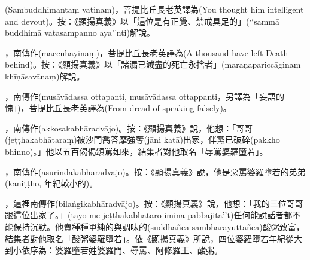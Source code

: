 \startitemgroup[noteitems]
\item{}(Sambuddhimantaṃ vatinaṃ)，菩提比丘長老英譯為(You thought him intelligent and devout)。按：《顯揚真義》以「這位是有正覺、禁戒具足的」(‘‘sammā buddhimā vatasampanno aya’’nti)解說。
\stopitemgroup

\startitemgroup[noteitems]
\item{}，南傳作(maccuhāyinaṃ)，菩提比丘長老英譯為(A thousand have left Death behind)。按：《顯揚真義》以「諸漏已滅盡的死亡永捨者」(maraṇapariccāginaṃ khīṇāsavānaṃ)解說。
\stopitemgroup

\startitemgroup[noteitems]
\item{}，南傳作(musāvādassa ottapanti, musāvādassa ottappanti，另譯為「妄語的愧」)，菩提比丘長老英譯為(From dread of speaking falsely)。
\stopitemgroup

\startitemgroup[noteitems]
\item{}，南傳作(akkosakabhāradvājo)。按：《顯揚真義》說，他想：「哥哥(jeṭṭhakabhātaraṃ)被沙門喬答摩強奪(jāni katā)出家，伴黨已破碎(pakkho bhinno)。」他以五百偈偈頌罵如來，結集者對他取名「辱罵婆羅墮若」。
\stopitemgroup

\startitemgroup[noteitems]
\item{}，南傳作(asurindakabhāradvājo)。按：《顯揚真義》說，他是惡罵婆羅墮若的弟弟(kaniṭṭho, 年紀較小的)。
\stopitemgroup

\startitemgroup[noteitems]
\item{}，這裡南傳作(bilaṅgikabhāradvājo)。按：《顯揚真義》說，他想：「我的三位哥哥跟這位出家了。」(tayo me jeṭṭhakabhātaro iminā pabbājitā’’t)任何能說話者都不能保持沉默。他賣種種單純的與調味的(suddhañca sambhārayuttañca)酸粥致富，結集者對他取名「酸粥婆羅墮若」。依《顯揚真義》所說，四位婆羅墮若年紀從大到小依序為：婆羅墮若姓婆羅門、辱罵、阿修羅王、酸粥。
\stopitemgroup

